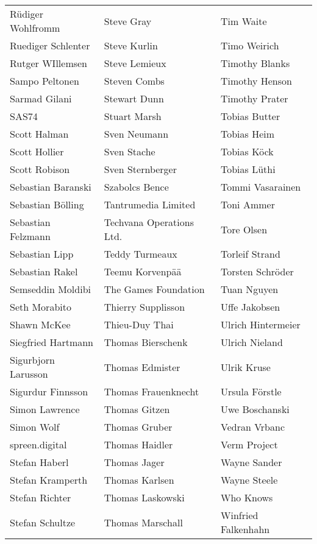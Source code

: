 \begin{tabular}{p{4.5cm}p{4.5cm}p{4.5cm}}
Rüdiger Wohlfromm & Steve Gray & Tim Waite \\
Ruediger Schlenter & Steve Kurlin & Timo Weirich \\
Rutger WIllemsen & Steve Lemieux & Timothy Blanks \\
Sampo Peltonen & Steven Combs & Timothy Henson \\
Sarmad Gilani & Stewart Dunn & Timothy Prater \\
SAS74 & Stuart Marsh & Tobias Butter \\
Scott Halman & Sven Neumann & Tobias Heim \\
Scott Hollier & Sven Stache & Tobias Köck \\
Scott Robison & Sven Sternberger & Tobias Lüthi \\
Sebastian Baranski & Szabolcs Bence & Tommi Vasarainen \\
Sebastian Bölling & Tantrumedia Limited & Toni Ammer \\
Sebastian Felzmann & Techvana Operations Ltd. & Tore Olsen \\
Sebastian Lipp & Teddy Turmeaux & Torleif Strand \\
Sebastian Rakel & Teemu Korvenpää & Torsten Schröder \\
Semseddin Moldibi & The Games Foundation & Tuan Nguyen \\
Seth Morabito & Thierry Supplisson & Uffe Jakobsen \\
Shawn McKee & Thieu-Duy Thai & Ulrich Hintermeier \\
Siegfried Hartmann & Thomas Bierschenk & Ulrich Nieland \\
Sigurbjorn Larusson & Thomas Edmister & Ulrik Kruse \\
Sigurdur Finnsson & Thomas Frauenknecht & Ursula Förstle \\
Simon Lawrence & Thomas Gitzen & Uwe Boschanski \\
Simon Wolf & Thomas Gruber & Vedran Vrbanc \\
spreen.digital & Thomas Haidler & Verm Project \\
Stefan Haberl & Thomas Jager & Wayne Sander \\
Stefan Kramperth & Thomas Karlsen & Wayne Steele \\
Stefan Richter & Thomas Laskowski & Who Knows \\
Stefan Schultze & Thomas Marschall & Winfried Falkenhahn \\

\end{tabular}
